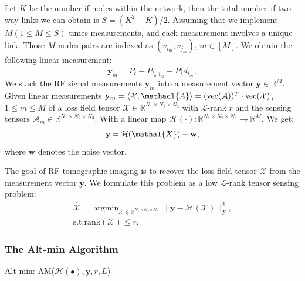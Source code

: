 \documentclass[journal,article,submit,moreauthors,pdftex,10pt,a4paper]{Definitions/mdpi}
\theoremstyle{plain}
\theoremstyle{definition}
\theoremstyle{remark}
\begin{document}
Let $K$ be the number if nodes within the network, then the total number if two-way links we can obtain is $S = (K^2 - K )/2$. Assuming that we implement $M(1 \leq M \leq S)$ times measurements, and each measurement involves a unique link. Those $M$ nodes pairs are indexed as $(v_{i_m}, v_{j_m})$, $m \in [M]$. We obtain the following linear measurement:
\begin{equation}
    \mathbf{y}_m = P_t - P_{i_mj_m} - \bar{P}(d_{i_m}, 
\end{equation}
We stack the RF signal measurements $\mathbf{y}_m$ into a measurement vector $\mathbf{y} \in \mathbb{R}^M$. Given linear measurements $\mathbf{y}_m = \langle \mathcal{X}, \mathacl{A} \rangle = (\text{vec}(\mathcal{A}))^T \cdot \text{vec}(\mathcal{X})$, $1 \leq m \leq M$ of a loss field tensor $\mathcal{X} \in \mathbb{R}^{N_1 \times N_2 \times N_3}$ with $\mathcal{L}$-rank $r$ and the sensing tensors $\mathcal{A}_m \in \mathbb{R}^{N_1 \times N_2 \times N_3}$. With a linear map $\mathcal{H}(\cdot):\mathbb{R}^{N_1 \times N_2 \times N_3} \to \mathbb{R}^M$. We get:
\begin{equation}
    \mathbf{y} = \mathcal{H}(\mathal{X}) + \mathbf{w},
\end{equation}
where $\mathbf{w}$ denotes the noise vector. 

The goal of RF tomographic imaging is to recover the loss field tensor $\mathcal{X}$ from the measurement vector $\mathbf{y}$. We formulate this problem as a low $\mathcal{L}$-rank tensor sensing problem:
\begin{eqnarray*}
    \widehat{\mathcal{X}} = \mathop{\arg\min}_{ \mathcal{X} \in \mathbb{R}^{N_1 \times N_2 \times N_3}}  \| \mathbf{y} - \mathcal{H}(\mathcal{X}) \|_F^2 , \\ \text{s.t.} \text{rank}(\mathcal{X}) \leq r .
\end{eqnarray*}
\unskip
\subsubsection{The Alt-min Algorithm}
\begin{algorithm}[htb]
    \caption{Alt-min: AM($\mathcal{H}(\bullet), \mathbf{y}, r, L$)}
    \label{alg:AM}
\end{algorithm}
\end{document}
